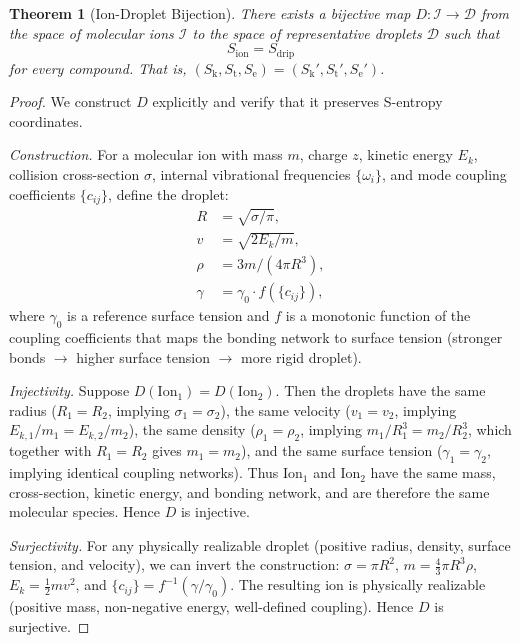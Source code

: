 \documentclass[11pt,twocolumn,a4paper]{article}
\newtheorem{theorem}{Theorem}[section]
\theoremstyle{definition}
\theoremstyle{remark}
\newcommand{\Sk}{S_{\mathrm{k}}}
\newcommand{\St}{S_{\mathrm{t}}}
\newcommand{\Se}{S_{\mathrm{e}}}
\begin{document}
\begin{theorem}[Ion-Droplet Bijection]\label{thm:bijection}
There exists a bijective map $D\colon \mathcal{I} \to \mathcal{D}$ from the space of molecular ions $\mathcal{I}$ to the space of representative droplets $\mathcal{D}$ such that
\begin{equation}\label{eq:s-preservation}
  S_{\mathrm{ion}} = S_{\mathrm{drip}}
\end{equation}
for every compound. That is, $(\Sk, \St, \Se) = (\Sk', \St', \Se')$.
\end{theorem}

\begin{proof}
We construct $D$ explicitly and verify that it preserves S-entropy coordinates.

\textit{Construction.} For a molecular ion with mass $m$, charge $z$, kinetic energy $E_k$, collision cross-section $\sigma$, internal vibrational frequencies $\{\omega_i\}$, and mode coupling coefficients $\{c_{ij}\}$, define the droplet:
\begin{align}
  R &= \sqrt{\sigma / \pi}, \\
  v &= \sqrt{2E_k / m}, \\
  \rho &= 3m / (4\pi R^3), \\
  \gamma &= \gamma_0 \cdot f(\{c_{ij}\}),
\end{align}
where $\gamma_0$ is a reference surface tension and $f$ is a monotonic function of the coupling coefficients that maps the bonding network to surface tension (stronger bonds $\to$ higher surface tension $\to$ more rigid droplet).

\textit{Injectivity.} Suppose $D(\text{Ion}_1) = D(\text{Ion}_2)$. Then the droplets have the same radius ($R_1 = R_2$, implying $\sigma_1 = \sigma_2$), the same velocity ($v_1 = v_2$, implying $E_{k,1}/m_1 = E_{k,2}/m_2$), the same density ($\rho_1 = \rho_2$, implying $m_1/R_1^3 = m_2/R_2^3$, which together with $R_1 = R_2$ gives $m_1 = m_2$), and the same surface tension ($\gamma_1 = \gamma_2$, implying identical coupling networks). Thus Ion$_1$ and Ion$_2$ have the same mass, cross-section, kinetic energy, and bonding network, and are therefore the same molecular species. Hence $D$ is injective.

\textit{Surjectivity.} For any physically realizable droplet (positive radius, density, surface tension, and velocity), we can invert the construction: $\sigma = \pi R^2$, $m = \frac{4}{3}\pi R^3 \rho$, $E_k = \frac{1}{2}mv^2$, and $\{c_{ij}\} = f^{-1}(\gamma/\gamma_0)$. The resulting ion is physically realizable (positive mass, non-negative energy, well-defined coupling). Hence $D$ is surjective.


\end{proof}
\end{document}

